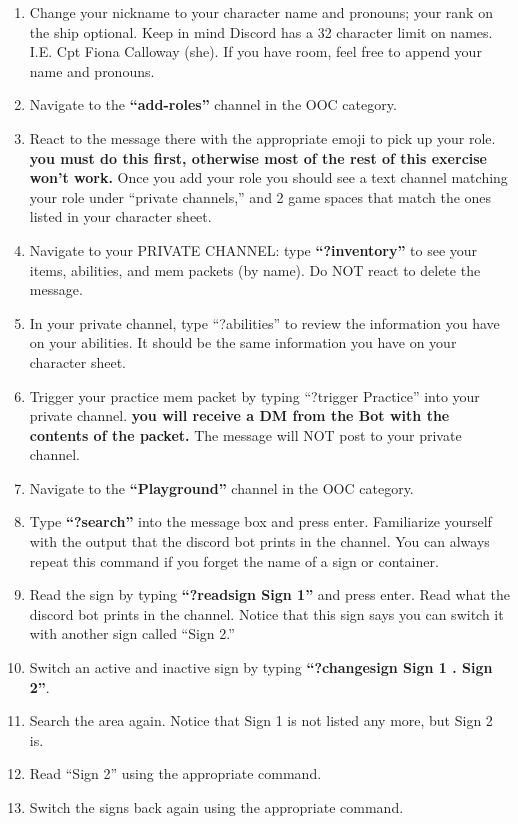 \documentclass[green]{TMFHope}
\begin{document}
\begin{enumerate}
  \item Change your nickname to your character name and pronouns; your rank on the ship optional. Keep in mind Discord has a 32 character limit on names. I.E. Cpt Fiona Calloway (she). If you have room, feel free to append your name and pronouns.
  \item Navigate to the \textbf{``add-roles''} channel in the OOC category.
  \item React to the message there with the appropriate emoji to pick up your role. \textbf{you must do this first, otherwise most of the rest of this exercise won't work.} Once you add your role you should see a text channel matching your role under ``private channels,'' and 2 game spaces that match the ones listed in your character sheet.
  \item Navigate to your PRIVATE CHANNEL: type \textbf{``?inventory''} to see your items, abilities, and mem packets (by name). Do NOT react to delete the message.
	\item In your private channel, type ``?abilities'' to review the information you have on your abilities. It should be the same information you have on your character sheet.
  \item Trigger your practice mem packet by typing ``?trigger Practice'' into your private channel. \textbf{you will receive a DM from the Bot with the contents of the packet.} The message will NOT post to your private channel.
  \item Navigate to the \textbf{``Playground''} channel in the OOC category.
  \item Type \textbf{``?search''} into the message box and press enter. Familiarize yourself with the output that the discord  bot prints in the channel. You can always repeat this command if you forget the name of a sign or container.
	\item Read the sign by typing \textbf{``?readsign Sign 1''} and press enter. Read what the discord bot prints in the channel. Notice that this sign says you can switch it with another sign called ``Sign 2.''
	\item Switch an active and inactive sign by typing \textbf{``?changesign Sign 1 . Sign 2''}. 
	\item Search the area again. Notice that Sign 1 is not listed any more, but Sign 2 is.
	\item Read ``Sign 2'' using the appropriate command.
	\item Switch the signs back again using the appropriate command.

\end{enumerate}
\end{document}
